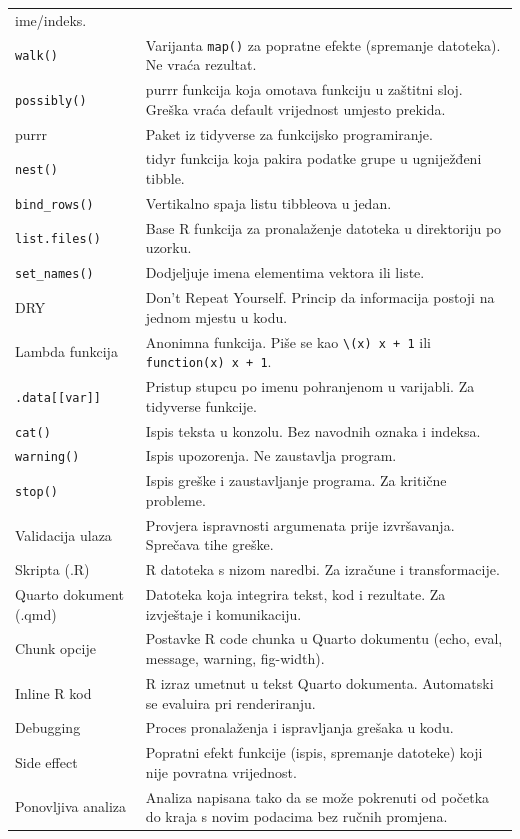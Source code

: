 \documentclass[
  croatian,
  letterpaper,
  DIV=11,
  numbers=noendperiod]{scrartcl}
\begin{document}
\begin{longtable}[]{@{}
  >{\raggedright\arraybackslash}p{}
  >{\raggedright\arraybackslash}p{}@{}}
ime/indeks. \\
\texttt{walk()} & Varijanta \texttt{map()} za popratne efekte (spremanje
datoteka). Ne vraća rezultat. \\
\texttt{possibly()} & purrr funkcija koja omotava funkciju u zaštitni
sloj. Greška vraća default vrijednost umjesto prekida. \\
purrr & Paket iz tidyverse za funkcijsko programiranje. \\
\texttt{nest()} & tidyr funkcija koja pakira podatke grupe u ugniježđeni
tibble. \\
\texttt{bind\_rows()} & Vertikalno spaja listu tibbleova u jedan. \\
\texttt{list.files()} & Base R funkcija za pronalaženje datoteka u
direktoriju po uzorku. \\
\texttt{set\_names()} & Dodjeljuje imena elementima vektora ili
liste. \\
DRY & Don't Repeat Yourself. Princip da informacija postoji na jednom
mjestu u kodu. \\
Lambda funkcija & Anonimna funkcija. Piše se kao
\texttt{\textbackslash{}(x)\ x\ +\ 1} ili
\texttt{function(x)\ x\ +\ 1}. \\
\texttt{.data{[}{[}var{]}{]}} & Pristup stupcu po imenu pohranjenom u
varijabli. Za tidyverse funkcije. \\
\texttt{cat()} & Ispis teksta u konzolu. Bez navodnih oznaka i
indeksa. \\
\texttt{warning()} & Ispis upozorenja. Ne zaustavlja program. \\
\texttt{stop()} & Ispis greške i zaustavljanje programa. Za kritične
probleme. \\
Validacija ulaza & Provjera ispravnosti argumenata prije izvršavanja.
Sprečava tihe greške. \\
Skripta (.R) & R datoteka s nizom naredbi. Za izračune i
transformacije. \\
Quarto dokument (.qmd) & Datoteka koja integrira tekst, kod i rezultate.
Za izvještaje i komunikaciju. \\
Chunk opcije & Postavke R code chunka u Quarto dokumentu (echo, eval,
message, warning, fig-width). \\
Inline R kod & R izraz umetnut u tekst Quarto dokumenta. Automatski se
evaluira pri renderiranju. \\
Debugging & Proces pronalaženja i ispravljanja grešaka u kodu. \\
Side effect & Popratni efekt funkcije (ispis, spremanje datoteke) koji
nije povratna vrijednost. \\
Ponovljiva analiza & Analiza napisana tako da se može pokrenuti od
početka do kraja s novim podacima bez ručnih promjena. \\
\end{longtable}
\end{document}
